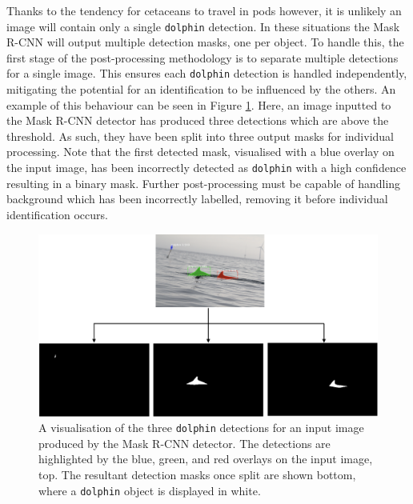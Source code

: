 Thanks to the tendency for cetaceans to travel in pods however, it is unlikely an image will contain only a single \texttt{dolphin} detection. In these situations the Mask R-CNN will output multiple detection masks, one per object. To handle this, the first stage of the post-processing methodology is to separate multiple detections for a single image. This ensures each \texttt{dolphin} detection is handled independently, mitigating the potential for an identification to be influenced by the others. An example of this behaviour can be seen in Figure \ref{fig:190730-001-MOLS0360_-detections}. Here, an image inputted to the Mask R-CNN detector has produced three detections which are above the threshold. As such, they have been split into three output masks for individual processing. Note that the first detected mask, visualised with a blue overlay on the input image, has been incorrectly detected as \texttt{dolphin} with a high confidence resulting in a binary mask. Further post-processing must be capable of handling background which has been incorrectly labelled, removing it before individual identification occurs.

\begin{figure}
	\begin{center}
		\includegraphics[scale=0.45]{Chapter5/figs/190730-001-MOLS0360_-detections.png}
	\end{center}
	\caption[A visualisation of the three \texttt{dolphin} detections for an input image produced by the Mask R-CNN detector.]{A visualisation of the three \texttt{dolphin} detections for an input image produced by the Mask R-CNN detector. The detections are highlighted by the blue, green, and red overlays on the input image, top. The resultant detection masks once split are shown bottom, where a \texttt{dolphin} object is displayed in white.}
	\label{fig:190730-001-MOLS0360_-detections}
\end{figure}

